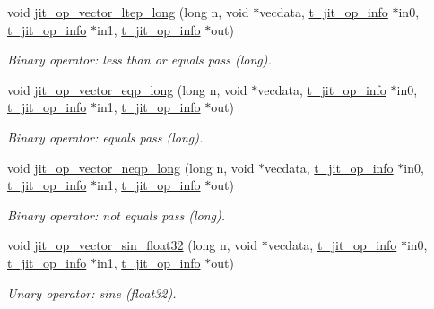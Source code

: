 \begin{DoxyCompactItemize}
void \hyperlink{group__opvecmod_gad0572850562b94c6f691d4a53bdb8eba}{jit\_\-op\_\-vector\_\-ltep\_\-long} (long n, void $\ast$vecdata, \hyperlink{structt__jit__op__info}{t\_\-jit\_\-op\_\-info} $\ast$in0, \hyperlink{structt__jit__op__info}{t\_\-jit\_\-op\_\-info} $\ast$in1, \hyperlink{structt__jit__op__info}{t\_\-jit\_\-op\_\-info} $\ast$out)
\begin{DoxyCompactList}\small\item\em Binary operator: less than or equals pass (long). \item\end{DoxyCompactList}\item 
void \hyperlink{group__opvecmod_gadb2504aa1c93b137d342d2f01df8d6c4}{jit\_\-op\_\-vector\_\-eqp\_\-long} (long n, void $\ast$vecdata, \hyperlink{structt__jit__op__info}{t\_\-jit\_\-op\_\-info} $\ast$in0, \hyperlink{structt__jit__op__info}{t\_\-jit\_\-op\_\-info} $\ast$in1, \hyperlink{structt__jit__op__info}{t\_\-jit\_\-op\_\-info} $\ast$out)
\begin{DoxyCompactList}\small\item\em Binary operator: equals pass (long). \item\end{DoxyCompactList}\item 
void \hyperlink{group__opvecmod_gac04014050c3a66b79f388e205c2b3d76}{jit\_\-op\_\-vector\_\-neqp\_\-long} (long n, void $\ast$vecdata, \hyperlink{structt__jit__op__info}{t\_\-jit\_\-op\_\-info} $\ast$in0, \hyperlink{structt__jit__op__info}{t\_\-jit\_\-op\_\-info} $\ast$in1, \hyperlink{structt__jit__op__info}{t\_\-jit\_\-op\_\-info} $\ast$out)
\begin{DoxyCompactList}\small\item\em Binary operator: not equals pass (long). \item\end{DoxyCompactList}\item 
void \hyperlink{group__opvecmod_ga429cbb18b30dddf38c26e3c40af428d6}{jit\_\-op\_\-vector\_\-sin\_\-float32} (long n, void $\ast$vecdata, \hyperlink{structt__jit__op__info}{t\_\-jit\_\-op\_\-info} $\ast$in0, \hyperlink{structt__jit__op__info}{t\_\-jit\_\-op\_\-info} $\ast$in1, \hyperlink{structt__jit__op__info}{t\_\-jit\_\-op\_\-info} $\ast$out)
\begin{DoxyCompactList}\small\item\em Unary operator: sine (float32). \item\end{DoxyCompactList}\item 

\end{DoxyCompactItemize}
